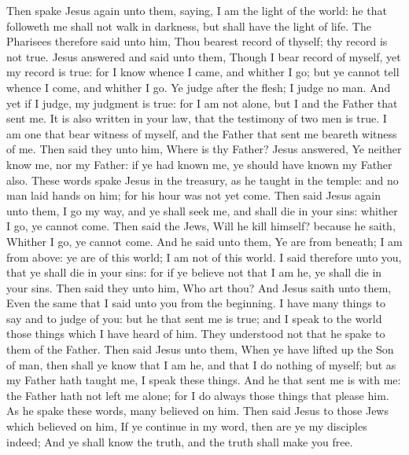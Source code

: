  Then spake Jesus again unto them, saying, I am the light
of the world: he that followeth me shall not walk in darkness, but shall
have the light of life.  The Pharisees therefore said unto
him, Thou bearest record of thyself; thy record is not true.
 Jesus answered and said unto them, Though I bear record of
myself, yet my record is true: for I know whence I came, and whither I
go; but ye cannot tell whence I come, and whither I go.  Ye
judge after the flesh; I judge no man.  And yet if I judge,
my judgment is true: for I am not alone, but I and the Father that sent
me.  It is also written in your law, that the testimony of
two men is true.  I am one that bear witness of myself, and
the Father that sent me beareth witness of me.  Then said
they unto him, Where is thy Father? Jesus answered, Ye neither know me,
nor my Father: if ye had known me, ye should have known my Father also.
 These words spake Jesus in the treasury, as he taught in
the temple: and no man laid hands on him; for his hour was not yet come.
 Then said Jesus again unto them, I go my way, and ye shall
seek me, and shall die in your sins: whither I go, ye cannot come.
 Then said the Jews, Will he kill himself? because he
saith, Whither I go, ye cannot come.  And he said unto
them, Ye are from beneath; I am from above: ye are of this world; I am
not of this world.  I said therefore unto you, that ye
shall die in your sins: for if ye believe not that I am he, ye shall die
in your sins.  Then said they unto him, Who art thou? And
Jesus saith unto them, Even the same that I said unto you from the
beginning.  I have many things to say and to judge of you:
but he that sent me is true; and I speak to the world those things which
I have heard of him.  They understood not that he spake to
them of the Father.  Then said Jesus unto them, When ye
have lifted up the Son of man, then shall ye know that I am he, and that
I do nothing of myself; but as my Father hath taught me, I speak these
things.  And he that sent me is with me: the Father hath
not left me alone; for I do always those things that please him.
 As he spake these words, many believed on him.
 Then said Jesus to those Jews which believed on him, If ye
continue in my word, then are ye my disciples indeed;  And
ye shall know the truth, and the truth shall make you free.

